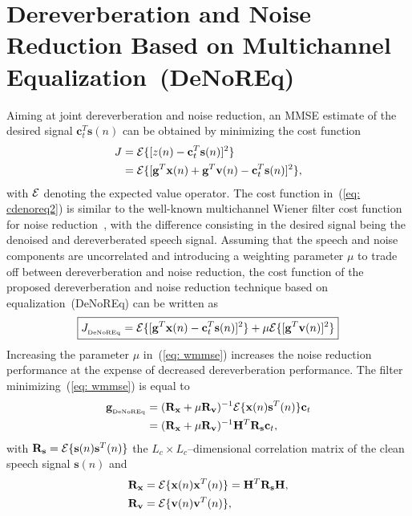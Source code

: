 \documentclass{article}
\begin{document}
\section{Dereverberation and Noise Reduction Based on Multichannel Equalization~(DeNoREq)}
Aiming at joint dereverberation and noise reduction, an MMSE estimate of the desired signal $\mathbf{c}_t^T \mathbf{s}(n)$ can be obtained by minimizing the cost function
\begin{align}
  \label{eq: cdenoreq1}
  J & = {\cal{E}} \{[z(n) - \mathbf{c}_t^T \mathbf{s}(n)]^2 \} \\
  \label{eq: cdenoreq2}
  & =  {\cal{E}} \{[\mathbf{g}^T \mathbf{x}(n) + \mathbf{g}^T \mathbf{v}(n) - \mathbf{c}_t^T \mathbf{s}(n)]^2 \},
\end{align}
with ${\cal{E}}$ denoting the expected value operator.
The cost function in~(\ref{eq: cdenoreq2}) is similar to the well-known multichannel Wiener filter cost function for noise reduction~\cite{Chen_ITASLP_2006}, with the difference consisting in the desired signal being the denoised and dereverberated speech signal.
Assuming that the speech and noise components are uncorrelated and introducing a weighting parameter $\mu$ to trade off between dereverberation and noise reduction, the cost function of the proposed dereverberation and noise reduction technique based on equalization~(DeNoREq) can be written as
\begin{equation}
  \label{eq: wmmse}
\boxed{J_{_{\rm DeNoREq}} = {\cal{E}} \{[\mathbf{g}^T\mathbf{x}(n) - \mathbf{c}_t^T\mathbf{s}(n)]^2 \} + \mu {\cal{E}} \{[\mathbf{g}^T \mathbf{v}(n) ]^2\}}
\end{equation}
Increasing the parameter $\mu$ in~(\ref{eq: wmmse}) increases the noise reduction performance at the expense of decreased dereverberation performance.
The filter minimizing~(\ref{eq: wmmse}) is equal to
\begin{align}
  \mathbf{g}_{_{\rm DeNoREq}} &= (\mathbf{R}_{\mathbf{x}} + \mu \mathbf{R}_{\mathbf{v}})^{-1} {\cal{E}} \{\mathbf{x}(n)\mathbf{s}^T(n)\}  \mathbf{c}_t \\
  \label{eq: wmmsefilt}
  &= (\mathbf{R}_{\mathbf{x}} + \mu \mathbf{R}_{\mathbf{v}})^{-1} \mathbf{H}^T \mathbf{R}_{\mathbf{s}}  \mathbf{c}_t,
\end{align}
with $\mathbf{R}_{\mathbf{s}} = {\cal{E}} \{\mathbf{s}(n)\mathbf{s}^T(n) \}$ the $L_c \times L_c$--dimensional correlation matrix of the clean speech signal $\mathbf{s}(n)$ and 
\begin{align}
\label{eq: Rx}
\mathbf{R}_{\mathbf{x}} & =  {\cal{E}} \{\mathbf{x}(n)\mathbf{x}^T(n) \}  =  \mathbf{H}^T \mathbf{R}_{\mathbf{s}} \mathbf{H}, \\
\label{Rv}
\mathbf{R}_{\mathbf{v}} & =  {\cal{E}} \{\mathbf{v}(n)\mathbf{v}^T(n) \},
\end{align}
\end{document}
